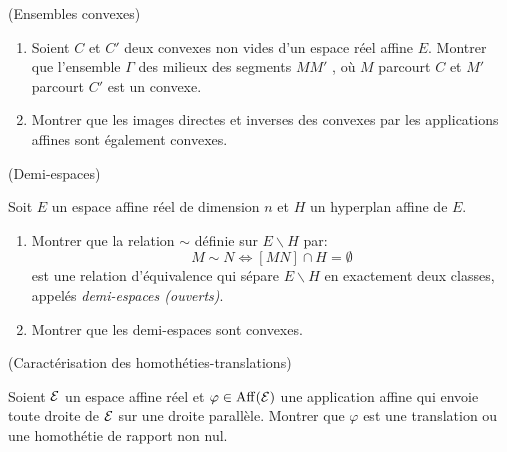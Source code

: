 \documentclass[a4paper,12pt,reqno]{amsart}
\begin{document}
\begin{exo} (Ensembles convexes)

  \begin{enumerate}
    \item Soient $C$ et $C'$ deux convexes non vides d'un espace réel affine $E$. Montrer que l'ensemble $\Gamma$ des milieux des segments $MM'$ , où $M$ parcourt $C$ et $M'$ parcourt $C'$ est un convexe.

    \item Montrer que les images directes et inverses des convexes par les applications affines sont également convexes.
  \end{enumerate}
\end{exo}

\begin{exo} (Demi-espaces)

  Soit $E$ un espace affine réel de dimension $n$ et $H$ un hyperplan affine de $E$.
  \begin{enumerate}

    \item Montrer que la relation $\sim $ définie sur $E\backslash H$ par:
      \[
        M\sim N\Longleftrightarrow[MN]\cap H=\emptyset
      \]
    est une relation d'équivalence qui sépare $E\backslash H$ en exactement deux classes, appelés \textit{demi-espaces (ouverts)}.

    \item Montrer que les demi-espaces sont convexes.
  \end{enumerate}
\end{exo}

\begin{exo} (Caractérisation des homothéties-translations)

  Soient $\mathcal{E}$ un espace affine réel et $\varphi \in \operatorname{Aff}(\mathcal{E})$ une application affine qui envoie toute droite de $\mathcal{E}$ sur une droite parallèle. Montrer que $\varphi$ est une translation ou une homothétie de rapport non nul.
\end{exo}
\end{document}
